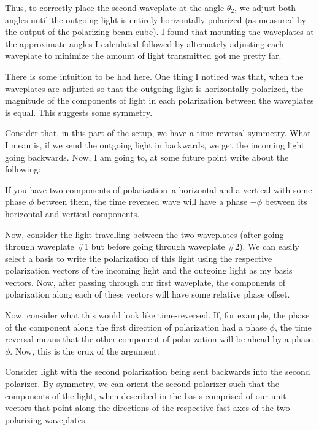 Thus, to correctly place the second waveplate at the angle  $\theta_2$, we adjust both angles until the outgoing light is entirely horizontally polarized (as measured by the output of the polarizing beam cube). I found that mounting the waveplates at the approximate angles I calculated followed by alternately adjusting each waveplate to minimize the amount of light transmitted got me pretty far. 

There is some intuition to be had here. One thing I noticed was that, when the waveplates are adjusted so that the outgoing light is horizontally polarized, the magnitude of the components of light in each polarization between the waveplates is equal. This suggests some symmetry. 

Consider that, in this part of the setup, we have a time-reversal symmetry. What I mean is, if we send the outgoing light in backwards, we get the incoming light going backwards. Now, I am going to, at some future point write about the following: 

If you have two components of polarization--a horizontal and a vertical with some phase $\phi$ between them, the time reversed wave will have a phase $-\phi$ between its horizontal and vertical components. 

Now, consider the light travelling between the two waveplates (after going through waveplate \#1 but before going through waveplate \#2). We can easily select a basis to write the polarization of this light using the respective polarization vectors of the incoming light and the outgoing light as my basis vectors. Now, after passing through our first waveplate, the components of polarization along each of these vectors will have some relative phase offset. 

Now, consider what this would look like time-reversed. If, for example, the phase of the component along the first direction of polarization had a phase $\phi$, the time reversal means that the other component of polarization will be ahead by a phase $\phi$. Now, this is the crux of the argument: 

Consider light with the second polarization being sent backwards into the second polarizer. By symmetry, we can orient the second polarizer such that the components of the light, when described in the basis comprised of our unit vectors that point along the directions of the respective fast axes of the two polarizing waveplates. 




